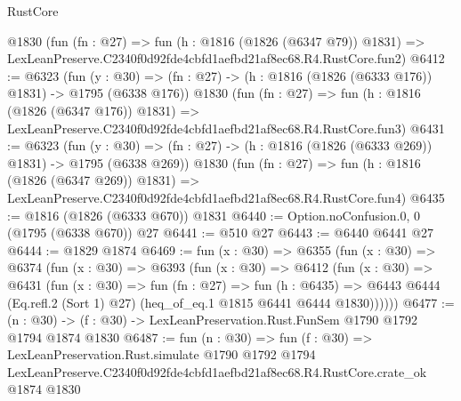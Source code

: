 \begin{lexlean}{RustCore}
\begin{coremodule}
    @1830
    (fun (fn : @27) =>
    fun (h : @1816 (@1826 (@6347 @79)) @1831) =>
    LexLeanPreserve.C2340f0d92fde4cbfd1aefbd21af8ec68.R4.RustCore.fun2)
@6412 := @6323
    (fun (y : @30) => (fn : @27) -> (h : @1816 (@1826 (@6333 @176)) @1831) -> @1795 (@6338 @176))
    @1830
    (fun (fn : @27) =>
    fun (h : @1816 (@1826 (@6347 @176)) @1831) =>
    LexLeanPreserve.C2340f0d92fde4cbfd1aefbd21af8ec68.R4.RustCore.fun3)
@6431 := @6323
    (fun (y : @30) => (fn : @27) -> (h : @1816 (@1826 (@6333 @269)) @1831) -> @1795 (@6338 @269))
    @1830
    (fun (fn : @27) =>
    fun (h : @1816 (@1826 (@6347 @269)) @1831) =>
    LexLeanPreserve.C2340f0d92fde4cbfd1aefbd21af8ec68.R4.RustCore.fun4)
@6435 := @1816 (@1826 (@6333 @670)) @1831
@6440 := Option.noConfusion.{0, 0} (@1795 (@6338 @670)) @27
@6441 := @510 @27
@6443 := @6440 @6441 @27
@6444 := @1829 @1874
@6469 := fun (x : @30) =>
  @6355
    (fun (x : @30) =>
    @6374
      (fun (x : @30) =>
      @6393
        (fun (x : @30) =>
        @6412
          (fun (x : @30) =>
          @6431
            (fun (x : @30) =>
            fun (fn : @27) =>
            fun (h : @6435) =>
            @6443 @6444 (Eq.refl.{2} (Sort 1) @27) (heq_of_eq.{1} @1815 @6441 @6444 @1830))))))
@6477 := (n : @30) -> (f : @30) -> LexLeanPreservation.Rust.FunSem @1790 @1792 @1794 @1874 @1830
@6487 := fun (n : @30) =>
  fun (f : @30) =>
  LexLeanPreservation.Rust.simulate
    @1790
    @1792
    @1794
    LexLeanPreserve.C2340f0d92fde4cbfd1aefbd21af8ec68.R4.RustCore.crate_ok
    @1874
    @1830
\end{coremodule}
\end{lexlean}

